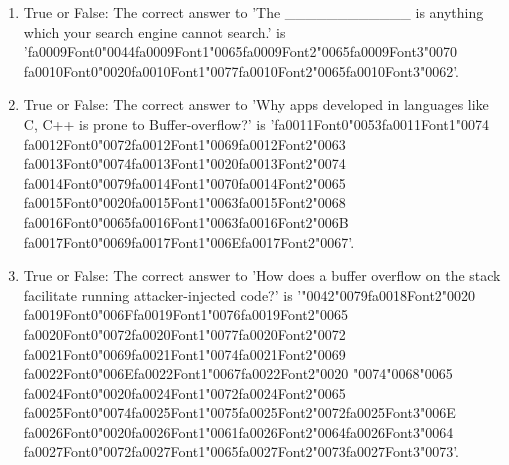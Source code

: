\documentclass[12pt]{article}
\begin{document}
\begin{enumerate}[label=\arabic*.]
\item True or False: The correct answer to 'The \_\_\_\_\_\_\_\_\_\_\_\_ is anything which your search engine cannot search.' is '{\csname fa0009Font0\endcsname\char"0044}{\csname fa0009Font1\endcsname\char"0065}{\csname fa0009Font2\endcsname\char"0065}{\csname fa0009Font3\endcsname\char"0070} {\csname fa0010Font0\endcsname\char"0020}{\csname fa0010Font1\endcsname\char"0077}{\csname fa0010Font2\endcsname\char"0065}{\csname fa0010Font3\endcsname\char"0062}'.
\item True or False: The correct answer to 'Why apps developed in languages like C, C++ is prone to Buffer-overflow?' is '{\csname fa0011Font0\endcsname\char"0053}{\csname fa0011Font1\endcsname\char"0074} {\csname fa0012Font0\endcsname\char"0072}{\csname fa0012Font1\endcsname\char"0069}{\csname fa0012Font2\endcsname\char"0063} {\csname fa0013Font0\endcsname\char"0074}{\csname fa0013Font1\endcsname\char"0020}{\csname fa0013Font2\endcsname\char"0074} {\csname fa0014Font0\endcsname\char"0079}{\csname fa0014Font1\endcsname\char"0070}{\csname fa0014Font2\endcsname\char"0065} {\csname fa0015Font0\endcsname\char"0020}{\csname fa0015Font1\endcsname\char"0063}{\csname fa0015Font2\endcsname\char"0068} {\csname fa0016Font0\endcsname\char"0065}{\csname fa0016Font1\endcsname\char"0063}{\csname fa0016Font2\endcsname\char"006B} {\csname fa0017Font0\endcsname\char"0069}{\csname fa0017Font1\endcsname\char"006E}{\csname fa0017Font2\endcsname\char"0067}'.
\item True or False: The correct answer to 'How does a buffer overflow on the stack facilitate running attacker-injected code?' is '{\char"0042}{\char"0079}{\csname fa0018Font2\endcsname\char"0020} {\csname fa0019Font0\endcsname\char"006F}{\csname fa0019Font1\endcsname\char"0076}{\csname fa0019Font2\endcsname\char"0065} {\csname fa0020Font0\endcsname\char"0072}{\csname fa0020Font1\endcsname\char"0077}{\csname fa0020Font2\endcsname\char"0072} {\csname fa0021Font0\endcsname\char"0069}{\csname fa0021Font1\endcsname\char"0074}{\csname fa0021Font2\endcsname\char"0069} {\csname fa0022Font0\endcsname\char"006E}{\csname fa0022Font1\endcsname\char"0067}{\csname fa0022Font2\endcsname\char"0020} {\char"0074}{\char"0068}{\char"0065} {\csname fa0024Font0\endcsname\char"0020}{\csname fa0024Font1\endcsname\char"0072}{\csname fa0024Font2\endcsname\char"0065} {\csname fa0025Font0\endcsname\char"0074}{\csname fa0025Font1\endcsname\char"0075}{\csname fa0025Font2\endcsname\char"0072}{\csname fa0025Font3\endcsname\char"006E} {\csname fa0026Font0\endcsname\char"0020}{\csname fa0026Font1\endcsname\char"0061}{\csname fa0026Font2\endcsname\char"0064}{\csname fa0026Font3\endcsname\char"0064} {\csname fa0027Font0\endcsname\char"0072}{\csname fa0027Font1\endcsname\char"0065}{\csname fa0027Font2\endcsname\char"0073}{\csname fa0027Font3\endcsname\char"0073}'.

\end{enumerate}
\end{document}
